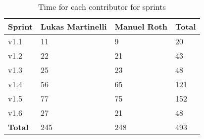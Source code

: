 \begin{table}[H]
\centering
    \begin{tabular}{llll}
    \textbf{Sprint}  & \textbf{Lukas Martinelli} & \textbf{Manuel Roth} & \textbf{Total} \\
    \hline
    v1.1    & 11               & 9           & 20    \\
    v1.2    & 22               & 21          & 43    \\
    v1.3    & 25               & 23          & 48    \\
    v1.4    & 56               & 65          & 121   \\
    v1.5    & 77               & 75          & 152   \\
    v1.6    & 27               & 21          & 48    \\
    \hline
    \textbf{Total}          & 245              & 248         & 493   \\
    \end{tabular}
    \caption{Time for each contributor for sprints}
\end{table}